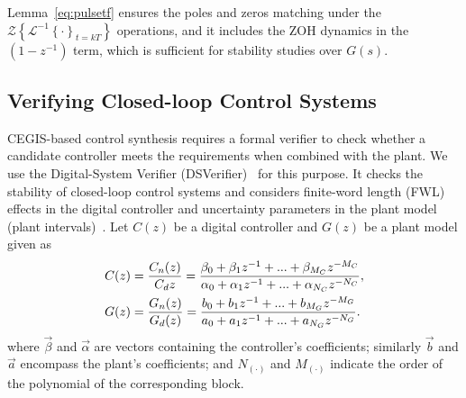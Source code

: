 \documentclass{sig-alternate-05-2015}
\newcommand{\red}[1]{{\color{red}#1}}
\begin{document}
Lemma~\ref{eq:pulsetf} ensures the poles and zeros matching under the 
$\mathcal{Z}\left\lbrace{\mathcal{L}^{-1}\left\lbrace{\cdot}\right\rbrace_{t=kT}}\right\rbrace$
operations, 
and it includes the ZOH dynamics in the $(1-z^{-1})$ term, 
which is sufficient for stability studies over $G(s)$.

\subsection{Verifying Closed-loop Control Systems}
\label{verifying-closed-loop-control-systems}




CEGIS-based control synthesis requires a formal verifier to check whether a
candidate controller meets the requirements when combined with the plant. 
We use the Digital-System Verifier (DSVerifier)~\cite{IsmailBCFF15} for this
purpose.  It checks the stability of closed-loop control systems and
considers finite-word length (FWL) effects in the digital controller and
uncertainty parameters in the plant model (plant intervals)~\cite{Bessa16}. 
Let $C(z)$ be a digital controller and $G(z)$ be a plant model given as
%
\begin{align}
\small
\label{controller_plant_tf}
C(z)&=\frac{C_n(z)}{C_d{z}}=\frac{\beta_{0}+\beta_{1}z^{-1}+...+\beta_{M_C}z^{-M_C}}{\alpha_{0}+\alpha_{1}z^{-1}+...+\alpha_{N_C}z^{-N_C}}, \\
G(z)&=\frac{G_n(z)}{G_d(z)}=\frac{b_{0}+b_{1}z^{-1}+...+b_{M_G}z^{-M_G}}{a_{0}+a_{1}z^{-1}+...+a_{N_G}z^{-N_G}}.
\end{align}
%
\noindent where $\vec{\beta}$ and $\vec{\alpha}$ are vectors containing the
controller's coefficients; similarly $\vec{b}$ and $\vec{a}$ encompass the
plant's coefficients; and $N_{(\cdot)}$ and $M_{(\cdot)}$ indicate the order of the polynomial of the corresponding block.
\end{document}
